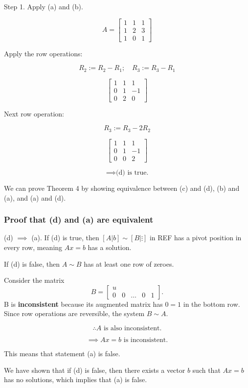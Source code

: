 \documentclass[12pt]{article}
\begin{document}
Step 1. Apply (a) and (b). %

\[
A = \begin{bmatrix}
  1 & 1 & 1 \\
  1 & 2 & 3 \\
  1 & 0 & 1
\end{bmatrix}
\]

Apply the row operations:

\[
R_2 := R_2 - R_1; \quad R_3 := R_3 - R_1
\]

\[
\begin{bmatrix}
  1 & 1 & 1 \\
  0 & 1 & -1 \\
  0 & 2 & 0
\end{bmatrix}
\]

Next row operation:

\[
R_3 := R_3 - 2R_2
\]

\[
\begin{bmatrix}
  1 & 1 & 1 \\
  0 & 1 & -1 \\
  0 & 0 & 2
\end{bmatrix}
\]

\[
\implies \text{(d) is true.}
\]

We can prove Theorem 4 by showing equivalence between (c) and (d), (b) and (a),
and (a) and (d).

\subsubsection{Proof that (d) and (a) are equivalent}

(d) $\implies$ (a). If (d) is true, then $[A|b] \sim [B|\vdots]$ in REF has a pivot 
position in every row, meaning $Ax=b$ has a solution.

If (d) is false, then $A \sim B$ has at least one row of zeroes.

Consider the matrix 
\[
B = \begin{bmatrix}
  u \\
  0 & 0 & \dots & 0 & 1
\end{bmatrix}.
\]
B is \textbf{inconsistent} because its augmented matrix has $0 = 1$ in the 
bottom row. Since row operations are reversible, the system $B \sim A$. 

\[
\therefore A \text{ is also inconsistent.}
\]

\[
\implies Ax = b \text{ is inconsistent.}
\]

This means that statement (a) is false.

We have shown that if (d) is false, then there exists a vector $b$ such that $Ax = b$
has no solutions, which implies that (a) is false.
\end{document}
